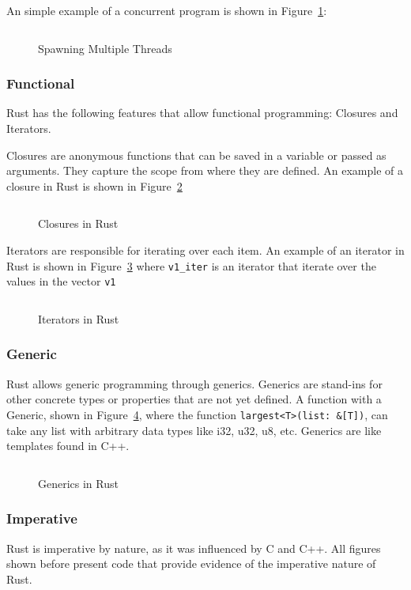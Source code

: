 \documentclass{article}
\newcommand{\rust}[1]{\inputminted{rust}{samples/rust/#1.rs}}
\newcommand{\rustin}[1]{\texttt{#1}}
\begin{document}
  An simple example of a concurrent program is shown in Figure~\ref{fig:thread}:

  \begin{figure}[ht]
    \rust{thread}
    \caption{Spawning Multiple Threads}
    \label{fig:thread}
  \end{figure}

  \subsubsection{Functional}
  Rust has the following features that allow functional programming: Closures
  and Iterators.

  Closures are anonymous functions that can be saved in a variable or passed as
  arguments. They capture the scope from where they are defined. An example of a
  closure in Rust is shown in Figure~\ref{fig:closure}

  \begin{figure}[ht]
    \rust{thread}
    \caption{Closures in Rust}
    \label{fig:closure}
  \end{figure}

  Iterators are responsible for iterating over each item. An example of an
  iterator in Rust is shown in Figure~\ref{fig:iterator} where \rustin{v1_iter}
  is an iterator that iterate over the values in the vector \rustin{v1}

  \begin{figure}[ht]
    \rust{iterator}
    \caption{Iterators in Rust}
    \label{fig:iterator}
  \end{figure}

  \subsubsection{Generic}
  Rust allows generic programming through generics. Generics are stand-ins for
  other concrete types or properties that are not yet defined. A function with a
  Generic, shown in Figure~\ref{fig:generic}, where the function
  \rustin{largest<T>(list: &[T])}, can take any list with arbitrary data types
  like i32, u32, u8, etc. Generics are like templates found in C++.

  \begin{figure}[ht]
    \rust{generics}
    \caption{Generics in Rust}
    \label{fig:generic}
  \end{figure}


  \subsubsection{Imperative}
  Rust is imperative by nature, as it was influenced by C and C++. All figures
  shown before present code that provide evidence of the imperative nature of
  Rust.
\end{document}

